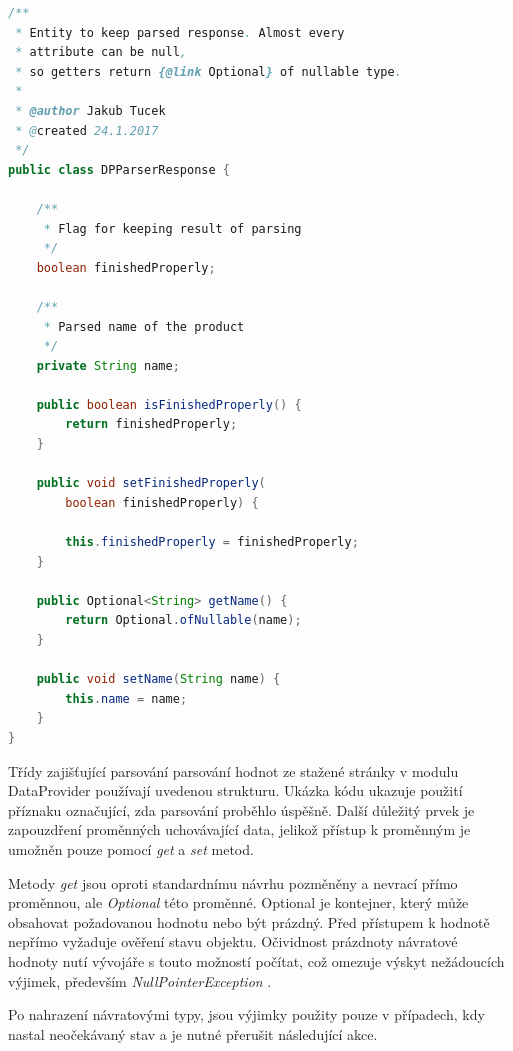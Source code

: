 \documentclass[thesis=B,czech]{FITthesis}[2012/06/26]
\begin{document}
\begin{lstlisting}[language=Java]
/**
 * Entity to keep parsed response. Almost every 
 * attribute can be null, 
 * so getters return {@link Optional} of nullable type.
 *
 * @author Jakub Tucek
 * @created 24.1.2017
 */
public class DPParserResponse {

    /**
     * Flag for keeping result of parsing
     */
    boolean finishedProperly;

    /**
     * Parsed name of the product
     */
    private String name;

    public boolean isFinishedProperly() {
        return finishedProperly;
    }

    public void setFinishedProperly(
    	boolean finishedProperly) {
    	
        this.finishedProperly = finishedProperly;
    }

    public Optional<String> getName() {
        return Optional.ofNullable(name);
    }

    public void setName(String name) {
        this.name = name;
    }
}
\end{lstlisting}

Třídy zajišťující parsování parsování hodnot ze stažené stránky v modulu DataProvider používají uvedenou strukturu.
Ukázka kódu ukazuje použití příznaku označující, zda parsování proběhlo úspěšně. Další důležitý prvek
je zapouzdření proměnných uchovávající data\cite{encapsulation}, jelikož přístup k proměnným je umožněn pouze pomocí \textit{get} a \textit{set} metod.
\par
Metody \textit{get} jsou oproti standardnímu návrhu pozměněny a nevrací přímo proměnnou, ale \textit{Optional} této proměnné.
Optional je kontejner, který může obsahovat požadovanou hodnotu \cite{optional} nebo být prázdný. 
Před přístupem k hodnotě nepřímo vyžaduje ověření stavu objektu. Očividnost prázdnoty návratové hodnoty nutí vývojáře s touto možností počítat, což
omezuje výskyt nežádoucích výjimek, především \textit{NullPointerException} \cite{nullPointerException}.
\par
Po nahrazení návratovými typy, jsou výjimky použity pouze v případech, kdy nastal neočekávaný stav a je nutné přerušit následující akce.
\end{document}
